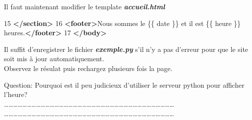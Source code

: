 \documentclass{article}
\newenvironment{Shaded}{}{}
\newcommand{\KeywordTok}[1]{\textcolor[rgb]{0.00,0.44,0.13}{\textbf{{#1}}}}
\newcommand{\DataTypeTok}[1]{\textcolor[rgb]{0.56,0.13,0.00}{{#1}}}
\newcommand{\DecValTok}[1]{\textcolor[rgb]{0.25,0.63,0.44}{{#1}}}
\newcommand{\CharTok}[1]{\textcolor[rgb]{0.25,0.44,0.63}{{#1}}}
\newcommand{\StringTok}[1]{\textcolor[rgb]{0.25,0.44,0.63}{{#1}}}
\newcommand{\CommentTok}[1]{\textcolor[rgb]{0.38,0.63,0.69}{\textit{{#1}}}}
\newcommand{\OtherTok}[1]{\textcolor[rgb]{0.00,0.44,0.13}{{#1}}}
\newcommand{\NormalTok}[1]{{#1}}
\begin{document}
\begin{Shaded}
\end{Shaded}

Il faut maintenant modifier le template \textbf{\emph{accueil.html}}

\begin{Shaded}
\begin{Highlighting}[]
\NormalTok{15     }\KeywordTok{</section>}
\NormalTok{16    }\KeywordTok{<footer>}\NormalTok{Nous sommes le \{\{ date \}\} et il est \{\{ heure \}\} heures.}\KeywordTok{</footer>}
\NormalTok{17     }\KeywordTok{</body>}
\end{Highlighting}
\end{Shaded}

Il suffit d'enregistrer le fichier \textbf{\emph{exemple.py}} s'il n'y a
pas d'erreur pour que le site soit mis à jour automatiquement.\\Observez
le résulat puis rechargez plusieurs fois la page.

Question: Pourquoi est il peu judicieux d'utiliser le serveur python
pour afficher
l'heure?\\\ldots{}\ldots{}\ldots{}\ldots{}\ldots{}\ldots{}\ldots{}\ldots{}\ldots{}\ldots{}\ldots{}\ldots{}\ldots{}\ldots{}\ldots{}\ldots{}\ldots{}\ldots{}\ldots{}\ldots{}\ldots{}\ldots{}\ldots{}\ldots{}\ldots{}\ldots{}\ldots{}\ldots{}\ldots{}\ldots{}\ldots{}\ldots{}\ldots{}\ldots{}\ldots{}\ldots{}\ldots{}\\\ldots{}\ldots{}\ldots{}\ldots{}\ldots{}\ldots{}\ldots{}\ldots{}\ldots{}\ldots{}\ldots{}\ldots{}\ldots{}\ldots{}\ldots{}\ldots{}\ldots{}\ldots{}\ldots{}\ldots{}\ldots{}\ldots{}\ldots{}\ldots{}\ldots{}\ldots{}\ldots{}\ldots{}\ldots{}\ldots{}\ldots{}\ldots{}\ldots{}\ldots{}\ldots{}\ldots{}\ldots{}
\end{document}
